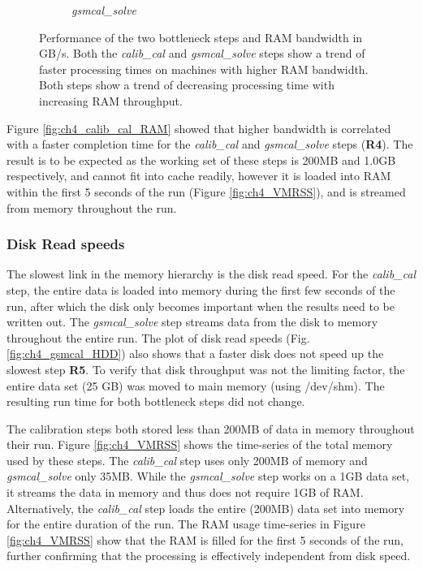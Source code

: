 \begin{figure}
\begin{subfigure}[b]{0.45\linewidth}
      \caption{\textit{gsmcal\_solve}}
	\label{fig:ch4_gamcal_RAM}
 \end{subfigure}
 \label{fig:ch4_ram_bandw}
    \caption[Effect of RAM throughput on the bottle neck steps for the four test machines.]{Performance of the two bottleneck steps and RAM bandwidth in GB/s. Both the \textit{calib\_cal} and \textit{gsmcal\_solve} steps show a trend of faster processing times on machines with higher RAM bandwidth. Both steps show a trend of decreasing processing time with increasing RAM throughput.} 
\end{figure}

Figure \ref{fig:ch4_calib_cal_RAM} showed that higher bandwidth is correlated with a faster completion time for the \textit{calib\_cal} and \textit{gsmcal\_solve} steps (\textbf{R4}). The result is to be expected as the working set of these steps is 200MB and 1.0GB respectively, and cannot fit into cache readily, however it is loaded into RAM within the first 5 seconds of the run (Figure \ref{fig:ch4_VMRSS}), and is streamed from memory throughout the run. 

\subsubsection{Disk Read speeds}

The slowest link in the memory hierarchy is the disk read speed. For the \textit{calib\_cal} step, the entire data is loaded into memory during the first few seconds of the run, after which the disk only becomes important when the results need to be written out. The \textit{gsmcal\_solve} step streams data from the disk to memory throughout the entire run.  The plot of disk read speeds (Fig. \ref{fig:ch4_gsmcal_HDD}) also shows that a faster disk does not speed up the slowest step \textbf{R5}. To verify that disk throughput was not the limiting factor, the entire data set (25 GB) was moved to main memory (using /dev/shm).  The resulting run time for both bottleneck steps did not change.  

The calibration steps both stored less than 200MB of data in memory throughout their run. Figure \ref{fig:ch4_VMRSS} shows the time-series of the total memory used by these steps. The \textit{calib\_cal} step uses only 200MB of memory and \textit{gsmcal\_solve} only 35MB. While the \textit{gsmcal\_solve} step works on a 1GB data set, it streams the data in memory and thus does not require 1GB of RAM. Alternatively, the \textit{calib\_cal} step loads the entire (200MB) data set into memory for the entire duration of the run. The RAM usage time-series in Figure \ref{fig:ch4_VMRSS} show that the RAM is filled for the first 5 seconds of the run, further confirming that the processing is effectively independent from disk speed. 


